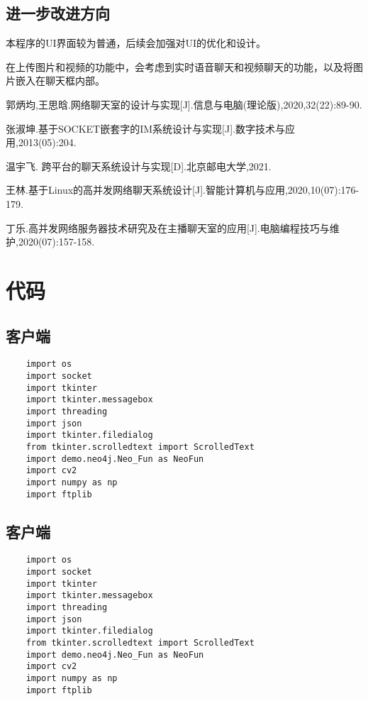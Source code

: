 \documentclass[forprint]{sql}
\begin{document}
\section{进一步改进方向}

本程序的UI界面较为普通，后续会加强对UI的优化和设计。

在上传图片和视频的功能中，会考虑到实时语音聊天和视频聊天的功能，以及将图片嵌入在聊天框内部。

\clearpage
\cleardoublepage{}
{}
\begin{thebibliography}{99}

   郭炳均,王思晗.网络聊天室的设计与实现[J].信息与电脑(理论版),2020,32(22):89-90.

   张淑坤.基于SOCKET嵌套字的IM系统设计与实现[J].数字技术与应用,2013(05):204.
  
  温宇飞. 跨平台的聊天系统设计与实现[D].北京邮电大学,2021.
  
  王林.基于Linux的高并发网络聊天系统设计[J].智能计算机与应用,2020,10(07):176-179.
  
  丁乐.高并发网络服务器技术研究及在主播聊天室的应用[J].电脑编程技巧与维护,2020(07):157-158.
\end{thebibliography}

\clearpage
\appendix


\chapter{代码}

\section{客户端}

\begin{lstlisting}
	import os
	import socket
	import tkinter
	import tkinter.messagebox
	import threading
	import json
	import tkinter.filedialog
	from tkinter.scrolledtext import ScrolledText
	import demo.neo4j.Neo_Fun as NeoFun
	import cv2
	import numpy as np
	import ftplib
\end{lstlisting}

\section{客户端}
\begin{lstlisting}
	import os
	import socket
	import tkinter
	import tkinter.messagebox
	import threading
	import json
	import tkinter.filedialog
	from tkinter.scrolledtext import ScrolledText
	import demo.neo4j.Neo_Fun as NeoFun
	import cv2
	import numpy as np
	import ftplib
\end{lstlisting}
\end{document}
